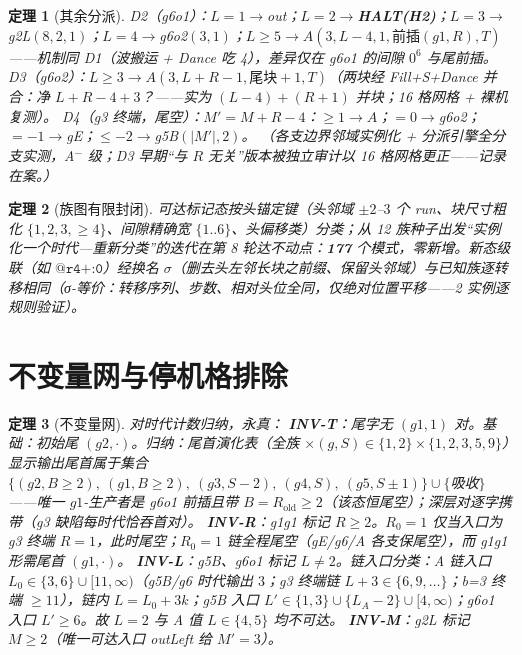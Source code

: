 \documentclass[11pt]{ctexart}
\newtheorem{theorem}{定理}[section]
\theoremstyle{definition}
\begin{document}
\begin{theorem}[其余分派]\label{thm:dispatch}
D2（g6o1）：$L{=}1\to$out；$L{=}2\to$\textbf{HALT(H2)}；$L{=}3\to$g2L$(8,2,1)$；$L{=}4\to$g6o2$(3,1)$；$L\ge5\to A(3,L{-}4,1,\text{前插}(g1,R),T)$——机制同 D1（波搬运 + Dance 吃 4），差异仅在 g6o1 的间隙 $0^6$ 与尾前插。
D3（g6o2）：$L\ge3\to A(3,L{+}R{-}1,\text{尾块}{+}1,T)$（两块经 Fill+S+Dance 并合：净 $L{+}R{-}4+3$？——实为 $(L{-}4){+}(R{+}1)$ 并块；16 格网格 + 裸机复测）。
D4（g3 终端，尾空）：$M'=M{+}R{-}4$：$\ge1\to A$；$=0\to$g6o2；$=-1\to$gE；$\le-2\to$g5B$(|M'|,2)$。
（各支边界邻域实例化 + 分派引擎全分支实测，A$^-$ 级；D3 早期``与 $R$ 无关''版本被独立审计以 16 格网格更正——记录在案。）
\end{theorem}

\begin{theorem}[族图有限封闭]\label{thm:closure}
可达标记态按头锚定键（头邻域 $\pm2$--$3$ 个 run、块尺寸粗化 $\{1,2,3,\ge4\}$、间隙精确宽 $\{1..6\}$、头偏移类）分类；从 12 族种子出发``实例化一个时代—重新分类''的迭代在第 8 轮达不动点：\textbf{177} 个模式，零新增。新态级联（如 $\texttt{@r4+:0}$）经换名 $\sigma$（删去头左邻长块之前缀、保留头邻域）与已知族逐转移相同（σ-等价：转移序列、步数、相对头位全同，仅绝对位置平移——2 实例逐规则验证）。
\end{theorem}

\section{不变量网与停机格排除}

\begin{theorem}[不变量网]\label{thm:inv}
对时代计数归纳，永真：
\textbf{INV-T}：尾字无 $(g1,1)$ 对。基础：初始尾 $(g2,\cdot)$。归纳：尾首演化表（全族 $\times(g,S)\in\{1,2\}\times\{1,2,3,5,9\}$）显示输出尾首属于集合 $\{(g2,B{\ge}2),\ (g1,B{\ge}2),\ (g3,S{-}2),\ (g4,S),\ (g5,S{\pm}1)\}\cup\{$吸收$\}$——唯一 $g1$-生产者是 g6o1 前插且带 $B=R_{\text{old}}\ge2$（该态恒尾空）；深层对逐字携带（g3 缺陷每时代恰吞首对）。
\textbf{INV-R}：g1g1 标记 $R\ge2$。$R_0{=}1$ 仅当入口为 g3 终端 $R{=}1$，此时尾空；$R_0{=}1$ 链全程尾空（gE/g6/A 各支保尾空），而 g1g1 形需尾首 $(g1,\cdot)$。
\textbf{INV-L}：g5B、g6o1 标记 $L\ne2$。链入口分类：A 链入口 $L_0\in\{3,6\}\cup[11,\infty)$（g5B/g6 时代输出 $3$；g3 终端链 $L{+}3\in\{6,9,\dots\}$；b=3 终端 $\ge11$），链内 $L=L_0{+}3k$；g5B 入口 $L'\in\{1,3\}\cup\{L_A{-}2\}\cup[4,\infty)$；g6o1 入口 $L'\ge6$。故 $L{=}2$ 与 A 值 $L\in\{4,5\}$ 均不可达。
\textbf{INV-M}：g2L 标记 $M\ge2$（唯一可达入口 outLeft 给 $M'{=}3$）。
\end{theorem}
\end{document}
